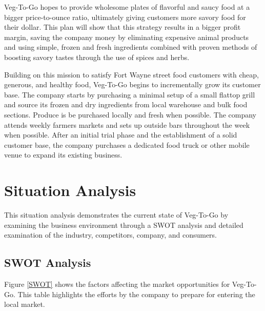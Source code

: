 \documentclass[12pt, letterpaper]{article}
\newcommand{\companyname}{Veg-To-Go}
\begin{document}
\companyname{} hopes to provide wholesome plates of flavorful and saucy food at a bigger price-to-ounce ratio, ultimately giving customers more savory food for their dollar.  This plan will show that this strategy results in a bigger profit margin, saving the company money by eliminating expensive animal products and using simple, frozen and fresh ingredients combined with proven methods of boosting savory tastes through the use of spices and herbs.

Building on this mission to satisfy Fort Wayne street food customers with cheap, generous, and healthy food, Veg-To-Go begins to incrementally grow its customer base.  The company starts by purchasing a minimal setup of a small flattop grill and source its frozen and dry ingredients from local warehouse and bulk food sections. Produce is be purchased locally and fresh when possible.  The company attends weekly farmers markets and sets up outside bars throughout the week when possible.  After an initial trial phase and the establishment of a solid customer base, the company purchases a dedicated food truck or other mobile venue to expand its existing business.

\newpage

\section{Situation Analysis}
This situation analysis demonstrates the current state of \companyname{} by examining the business environment through a SWOT analysis and detailed examination of the industry, competitors, company, and consumers.

\subsection{SWOT Analysis}
Figure \ref{SWOT} shows the factors affecting the market opportunities for \companyname{}.  This table highlights the efforts by the company to prepare for entering the local market.
\end{document}
